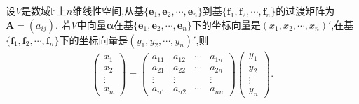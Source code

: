 \documentclass[../../main.tex]{subfiles}
\begin{document}
\begin{theorem}[同一向量在不同基下坐标向量的关系]\label{theorem:同一向量在不同基下坐标向量的关系}
设\(V\)是数域\(\mathbb{F}\)上\(n\)维线性空间,从基\(\{\boldsymbol{e}_1,\boldsymbol{e}_2,\cdots,\boldsymbol{e}_n\}\)到基\(\{\boldsymbol{f}_1,\boldsymbol{f}_2,\cdots,\boldsymbol{f}_n\}\)的过渡矩阵为\(\boldsymbol{A}=(a_{ij})\). 若\(V\)中向量\(\boldsymbol{\alpha}\)在基\(\{\boldsymbol{e}_1,\boldsymbol{e}_2,\cdots,\boldsymbol{e}_n\}\)下的坐标向量是\((x_1,x_2,\cdots,x_n)'\),在基\(\{\boldsymbol{f}_1,\boldsymbol{f}_2,\cdots,\boldsymbol{f}_n\}\)下的坐标向量是\((y_1,y_2,\cdots,y_n)'\),则
\begin{gather*}
\begin{pmatrix}
x_1\\
x_2\\
\vdots\\
x_n
\end{pmatrix}=\begin{pmatrix}
a_{11}&a_{12}&\cdots&a_{1n}\\
a_{21}&a_{22}&\cdots&a_{2n}\\
\vdots&\vdots&&\vdots\\
a_{n1}&a_{n2}&\cdots&a_{nn}
\end{pmatrix}\begin{pmatrix}
y_1\\
y_2\\
\vdots\\
y_n
\end{pmatrix}.
\end{gather*}
\end{theorem}
\end{document}
